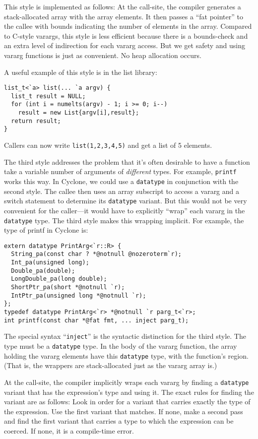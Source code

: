 This style is implemented as follows: At the call-site, the compiler
generates a stack-allocated array with the array elements.  It then
passes a ``fat pointer'' to the callee with bounds indicating the
number of elements in the array.  Compared to C-style varargs, this
style is less efficient because there is a bounds-check and an extra
level of indirection for each vararg access.  But we get safety and
using vararg functions is just as convenient.  No heap allocation
occurs.

A useful example of this style is in the list library:
\begin{verbatim}
list_t<`a> list(... `a argv) {
  list_t result = NULL;
  for (int i = numelts(argv) - 1; i >= 0; i--) 
    result = new List{argv[i],result};
  return result;
}
\end{verbatim}
Callers can now write \texttt{list(1,2,3,4,5)} and get a list of 5
elements.

The third style addresses the problem that it's often desirable to
have a function take a variable number of arguments of
\emph{different} types.  For example, \texttt{printf} works this way.
In Cyclone, we could use a \texttt{datatype} in conjunction with the
second style.  The callee then uses an array subscript to access a
vararg and a switch statement to determine its \texttt{datatype}
variant.  But this would not be very convenient for the caller---it
would have to explicitly ``wrap'' each vararg in the \texttt{datatype}
type.  The third style makes this wrapping implicit.  For example, the
type of printf in Cyclone is:

\begin{verbatim}
extern datatype PrintArg<`r::R> {
  String_pa(const char ? *@notnull @nozeroterm`r);
  Int_pa(unsigned long);
  Double_pa(double);
  LongDouble_pa(long double);
  ShortPtr_pa(short *@notnull `r);
  IntPtr_pa(unsigned long *@notnull `r);
};
typedef datatype PrintArg<`r> *@notnull `r parg_t<`r>;
int printf(const char *@fat fmt, ... inject parg_t);
\end{verbatim}

The special syntax ``\texttt{inject}'' is the syntactic distinction
for the third style.  The type must be a \texttt{datatype} type.  In the
body of the vararg function, the array holding the vararg elements have
this \texttt{datatype} type, with the function's region.  (That is, the
wrappers are stack-allocated just as the vararg array is.)

At the call-site, the compiler implicitly wraps each vararg by finding
a \texttt{datatype} variant that has the expression's type and using
it.  The exact rules for finding the variant are as follows:  Look in
order for a variant that carries exactly the type of the expression.
Use the first variant that matches.  If none, make a second pass and
find the first variant that carries a type to which the expression can
be coerced.  If none, it is a compile-time error.

